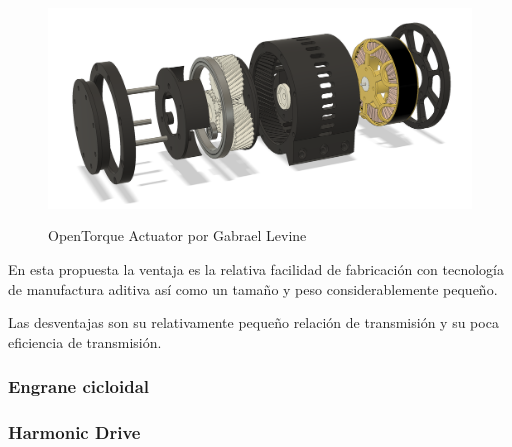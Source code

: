 \begin{figure}[h]
    \centering
    \includegraphics[width=15cm, height=6cm, keepaspectratio]{./img/chapter6/opentorque.png}
    \caption{OpenTorque Actuator por Gabrael Levine}
    \label{fig:opentorque}
\end{figure}

En esta propuesta la ventaja es la relativa facilidad de fabricación con tecnología de manufactura aditiva así como un tamaño y peso considerablemente pequeño.

Las desventajas son su relativamente pequeño relación de transmisión y su poca eficiencia de transmisión.

\subsubsection{Engrane cicloidal}
\subsubsection{Harmonic Drive}

  